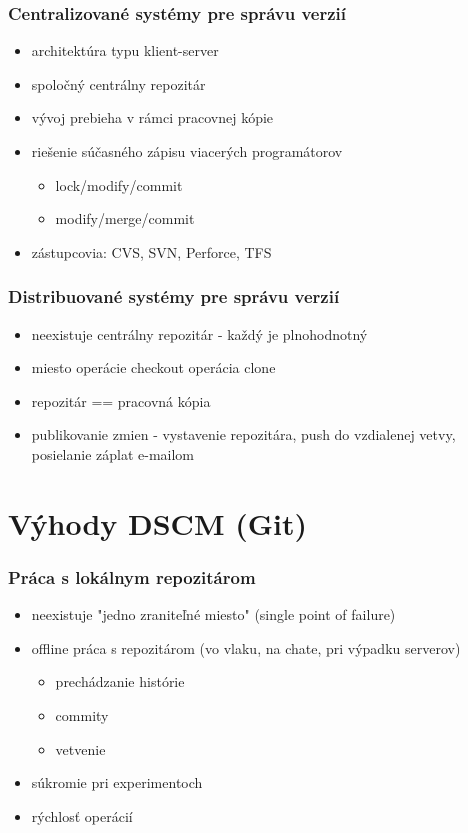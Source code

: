 \documentclass[red]{beamer}
\begin{document}
\begin{frame}
  \frametitle{Centralizované systémy pre správu verzií}   %

\begin{itemize}
\item architektúra typu klient-server
\item spoločný centrálny repozitár
\item vývoj prebieha v rámci pracovnej kópie
\item riešenie súčasného zápisu viacerých programátorov
\begin{itemize}
\item lock/modify/commit
\item modify/merge/commit
 \end{itemize}
\item zástupcovia: CVS, SVN, Perforce, TFS
 \end{itemize}
\end{frame}

\begin{frame}
  \frametitle{Distribuované systémy pre správu verzií}   %

\begin{itemize}
\item neexistuje centrálny repozitár - každý je plnohodnotný
\item miesto operácie checkout operácia clone
\item repozitár == pracovná kópia
\item publikovanie zmien - vystavenie repozitára, push do vzdialenej vetvy, posielanie záplat e-mailom
 \end{itemize}
\end{frame}

\section{Výhody DSCM (Git)}

\begin{frame}
  \frametitle{Práca s lokálnym repozitárom}   %

\begin{itemize}
\item neexistuje "jedno zraniteľné miesto" (single point of failure)
\item offline práca s repozitárom (vo vlaku, na chate, pri výpadku serverov)
\begin{itemize}
\item prechádzanie histórie
\item commity
\item vetvenie
 \end{itemize}
\item súkromie pri experimentoch
\item rýchlosť operácií
 \end{itemize}
\end{frame}
\end{document}
